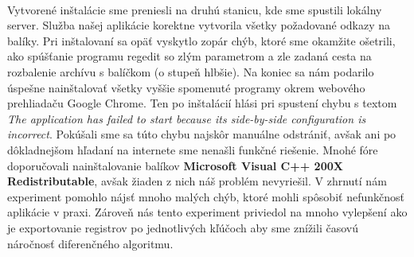 \paragraph{}
Vytvorené inštalácie sme preniesli na druhú stanicu, kde sme spustili lokálny server. Služba našej aplikácie korektne vytvorila všetky požadované odkazy na balíky. Pri inštalovaní sa opäť vyskytlo zopár chýb, ktoré sme okamžite ošetrili, ako spúšťanie programu regedit so zlým parametrom a zle zadaná cesta na rozbalenie archívu s balíčkom (o stupeň hlbšie). Na koniec sa nám podarilo úspešne nainštalovať všetky vyššie spomenuté programy okrem webového prehliadaču Google Chrome. Ten po inštalácií hlási pri spustení chybu s textom \textit{The application has failed to start because its side-by-side configuration is incorrect}. Pokúšali sme sa túto chybu najskôr manuálne odstrániť, avšak ani po dôkladnejšom hľadaní na internete sme nenašli funkčné riešenie. Mnohé fóre doporučovali nainštalovanie balíkov \textbf{Microsoft Visual C++ 200X Redistributable}, avšak žiaden z nich náš problém nevyriešil. V zhrnutí nám experiment pomohlo nájsť mnoho malých chýb, ktoré mohli spôsobiť nefunkčnosť aplikácie v praxi. Zároveň nás tento experiment priviedol na mnoho vylepšení ako je exportovanie registrov po jednotlivých kľúčoch aby sme znížili časovú náročnosť diferenčného algoritmu.